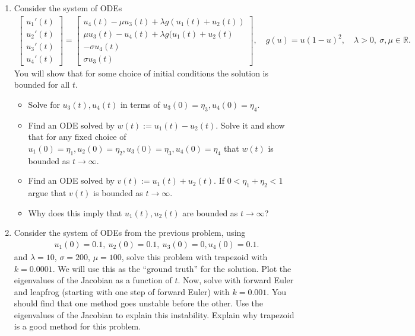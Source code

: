 \documentclass[10pt]{amsart}
\begin{document}
\begin{enumerate}[label={\bf Problem~{\arabic*}:}]
\item Consider the system of ODEs
  \begin{align*}
      \begin{bmatrix} u_1'(t) \\ u_2'(t) \\ u_3'(t) \\ u_4'(t) \end{bmatrix} = \begin{bmatrix} u_4(t) - \mu u_3(t) + \lambda g(u_1(t) + u_2(t))\\
        \mu u_3(t) - u_4(t) +  \lambda g(u_1(t) + u_2(t)\\
        - \sigma u_4(t) \\
      \sigma  u_3(t) \end{bmatrix}, \quad g(u) = u (1-u)^2, \quad \lambda > 0, ~ \sigma, \mu \in \mathbb R.
  \end{align*}
  You will show that for some choice of initial conditions the solution is bounded for all $t$.
  \begin{itemize}
  \item Solve for $u_3(t),u_4(t)$ in terms of $u_3(0) = \eta_3,u _4(0) = \eta_4$.
  \item Find an ODE solved by $w(t) := u_1(t) - u_2(t)$.  Solve it and show that for any fixed choice of $u_1(0) = \eta_1,u_2(0) = \eta_2,u_3(0) = \eta_3,u _4(0) = \eta_4$ that  $w(t)$ is bounded as $t \to \infty$.
  \item Find an ODE solved by $v(t) := u_1(t) + u_2(t)$.  If $0 < \eta_1 + \eta_2 < 1$ argue that $v(t)$ is bounded as $t \to \infty$.
  \item Why does this imply that $u_1(t), u_2(t)$ are bounded as $t \to \infty$?
  \end{itemize}

  \mline
\item Consider the system of ODEs from the previous problem, using
  \begin{align*}
    u_1(0) = 0.1, ~u_2(0) = 0.1, ~u_3(0) = 0, u_4(0) = 0.1.
  \end{align*}
  and $\lambda = 10$, $\sigma = 200$, $\mu = 100$, solve this problem with trapezoid with $k = 0.0001$.  We will use this as the ``ground truth'' for the solution. Plot the eigenvalues of the Jacobian as a function of $t$.  Now, solve with forward Euler and leapfrog (starting with one step of forward Euler) with $k = 0.001$.  You should find that one method goes unstable before the other.   Use the eigenvalues of the Jacobian to explain this instability. Explain why trapezoid is a good method for this problem.\\
  

\end{enumerate}
\end{document}
